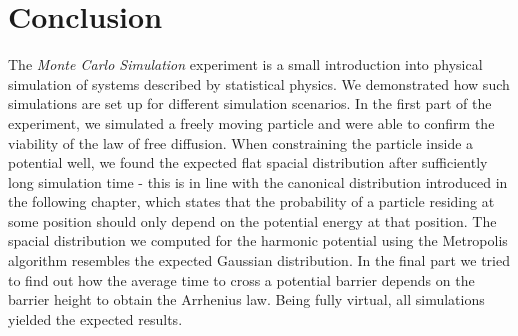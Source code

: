 \documentclass[
    parskip=half, 
    twoside=false,
    twocolumn=true,
    fontsize=11pt,
]{scrarticle}
\begin{document}
\section{Conclusion}

The \textit{Monte Carlo Simulation} experiment is a small introduction into physical simulation of systems described by statistical physics. We demonstrated how such simulations are set up for different simulation scenarios. In the first part of the experiment, we simulated a freely moving particle and were able to confirm the viability of the law of free diffusion. When constraining the particle inside a potential well, we found the expected flat spacial distribution after sufficiently long simulation time - this is in line with the canonical distribution introduced in the following chapter, which states that the probability of a particle residing at some position should only depend on the potential energy at that position. The spacial distribution we computed for the harmonic potential using the Metropolis algorithm resembles the expected Gaussian distribution. In the final part we tried to find out how the average time to cross a potential barrier depends on the barrier height to obtain the Arrhenius law. Being fully virtual, all simulations yielded the expected results.

\nocite{*}
\printbibliography
\end{document}
